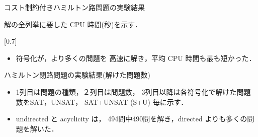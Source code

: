 \documentclass[dvipdfmx]{beamer}
\begin{document}
\begin{frame}[noframenumbering]{コスト制約付きハミルトン路問題の実験結果}

\begin{block}{}\centering
  解の全列挙に要した CPU 時間(秒)を示す．
\end{block}

\begin{center}
  \scalebox{0.7}[0.7]{
    
  }
\end{center}


\begin{itemize}
\item {} 符号化が，より多くの問題を
  高速に解き，平均 CPU 時間も最も短かった．
\end{itemize}  
\end{frame}
\begin{frame}[noframenumbering]{ハミルトン閉路問題の実験結果(解けた問題数)}

\begin{itemize}
\item 1列目は問題の種類，２列目は問題数，
  3列目以降は各符号化で解けた問題数を\textsf{SAT}，\textsf{UNSAT}，
  \textsf{SAT+UNSAT} (\textsf{S+U}) 毎に示す．
\item \textsf{undirected} と \textsf{acyclicity} は，
  494問中490問を解き，\textsf{directed} よりも多くの問題を解いた．
\end{itemize}
\end{frame}
\end{document}
